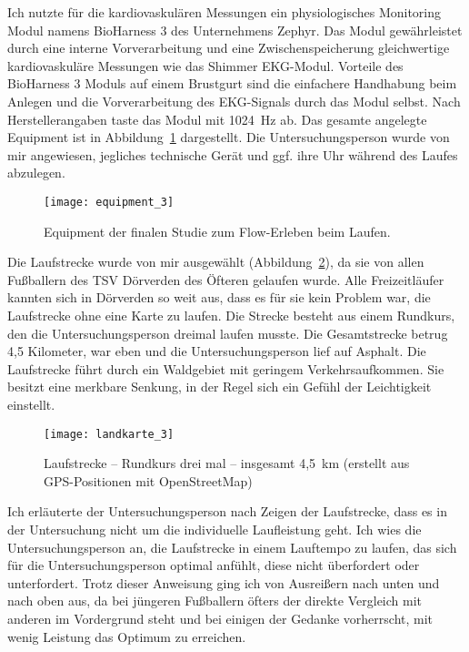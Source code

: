 Ich nutzte für die kardiovaskulären Messungen ein physiologisches Monitoring Modul namens BioHarness 3 des Unternehmens Zephyr. Das Modul gewährleistet durch eine interne Vorverarbeitung und eine Zwischenspeicherung gleichwertige kardiovaskuläre Messungen wie das Shimmer EKG-Modul. Vorteile des BioHarness 3 Moduls auf einem Brustgurt sind die einfachere Handhabung beim Anlegen und die Vorverarbeitung des \ac{EKG}-Signals durch das Modul selbst. Nach Herstellerangaben taste das Modul mit 1024~Hz ab. Das gesamte angelegte Equipment ist in Abbildung~\ref{fig:equipment_3} dargestellt. Die Untersuchungsperson wurde von mir angewiesen, jegliches technische Gerät und ggf. ihre Uhr während des Laufes abzulegen. 
\begin{figure}
	[!htb] \centering 
	\texttt{[image: equipment\_3]} \caption[Equipment der finalen Studie zum Flow-Erleben beim Laufen]{Equipment der finalen Studie zum Flow-Erleben beim Laufen.} \label{fig:equipment_3} 
\end{figure}

Die Laufstrecke wurde von mir ausgewählt (Abbildung~\ref{fig:landkarte_3}), da sie von allen Fußballern des TSV Dörverden des Öfteren gelaufen wurde. Alle Freizeitläufer kannten sich in Dörverden so weit aus, dass es für sie kein Problem war, die Laufstrecke ohne eine Karte zu laufen. Die Strecke besteht aus einem Rundkurs, den die Untersuchungsperson dreimal laufen musste. Die Gesamtstrecke betrug 4,5 Kilometer, war eben und die Untersuchungsperson lief auf Asphalt. Die Laufstrecke führt durch ein Waldgebiet mit geringem Verkehrsaufkommen. Sie besitzt eine merkbare Senkung, in der Regel sich ein Gefühl der Leichtigkeit einstellt. 
\begin{figure}
	[!htb] \centering 
	\texttt{[image: landkarte\_3]} \caption[Laufstrecke -- Rundkurs]{Laufstrecke -- Rundkurs drei mal -- insgesamt 4,5~km (erstellt aus GPS-Positionen mit OpenStreetMap)} \label{fig:landkarte_3} 
\end{figure}

Ich erläuterte der Untersuchungsperson nach Zeigen der Laufstrecke, dass es in der Untersuchung nicht um die individuelle Laufleistung geht. Ich wies die Untersuchungsperson an, die Laufstrecke in einem Lauftempo zu laufen, das sich für die Untersuchungsperson optimal anfühlt, diese nicht überfordert oder unterfordert. Trotz dieser Anweisung ging ich von Ausreißern nach unten und nach oben aus, da bei jüngeren Fußballern öfters der direkte Vergleich mit anderen im Vordergrund steht und bei einigen der Gedanke vorherrscht, mit wenig Leistung das Optimum zu erreichen. 

